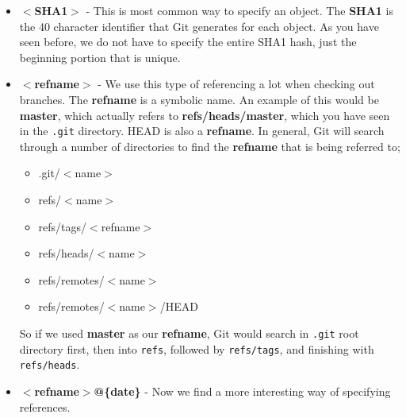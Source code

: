 \begin{itemize}
\item{}\textbf{$<$SHA1$>$} - This is most common way to specify an object.
The \textbf{SHA1} is the 40 character identifier that Git generates for each object.
As you have seen before, we do not have to specify the entire SHA1 hash, just the beginning portion that is unique.

\item{}\textbf{$<$refname$>$} - We use this type of referencing a lot when checking out branches.  
The \textbf{refname} is a symbolic name.
An example of this would be \textbf{master}, which actually refers to \textbf{refs/heads/master}, which you have seen in the \texttt{.git} directory.
HEAD is also a \textbf{refname}.  In general, Git will search through a number of directories to find the \textbf{refname} that is being referred to;
\begin{itemize}
\item .git/$<$name$>$
\item refs/$<$name$>$
\item refs/tags/$<$refname$>$
\item refs/heads/$<$name$>$
\item refs/remotes/$<$name$>$
\item refs/remotes/$<$name$>$/HEAD
\end{itemize}
So if we used \textbf{master} as our \textbf{refname}, Git would search in \texttt{.git} root directory first,
then into \texttt{refs}, followed by \texttt{refs/tags}, and finishing with \texttt{refs/heads}.

\item{}\textbf{$<$refname$>$@\{date\}} - Now we find a more interesting way of specifying references.
\end{itemize}
